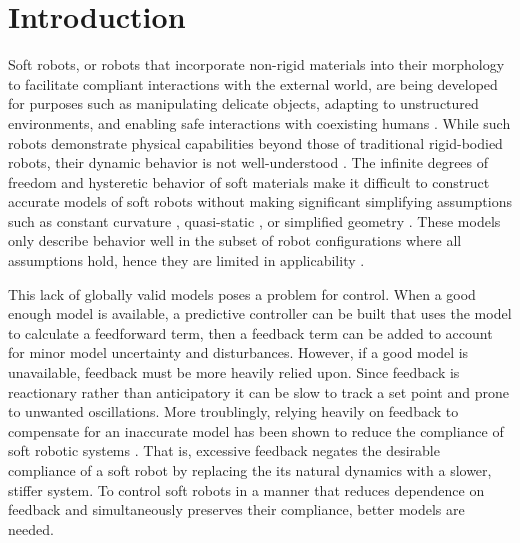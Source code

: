\section{Introduction}
\label{sec:intro}

Soft robots, or robots that incorporate non-rigid materials into their morphology to facilitate compliant interactions with the external world, are being developed for purposes such as manipulating delicate objects, adapting to unstructured environments, and enabling safe interactions with coexisting humans \cite{rus2015design}.
While such robots demonstrate physical capabilities beyond those of traditional rigid-bodied robots, their dynamic behavior is not well-understood \cite{george2018control}.
The infinite degrees of freedom and hysteretic behavior of soft materials make it difficult to construct accurate models of soft robots without making significant simplifying assumptions such as constant curvature \cite{rus2015design}, quasi-static \cite{george2018control}, or simplified geometry \cite{bruder2017model} .
These models 
only describe behavior well in the subset of robot configurations where all assumptions hold, hence they are limited in applicability .

This lack of globally valid models poses a problem for control.
When a good enough model   is available, a predictive controller can be built that uses the model to calculate a feedforward term, then a feedback term can be added to account for minor model uncertainty and disturbances.
However, if a good model is unavailable, feedback must be more heavily relied upon.
Since feedback is reactionary rather than anticipatory it can be slow to track a set point and prone to unwanted oscillations.
More troublingly, relying heavily on feedback to compensate for an inaccurate model has been shown to reduce the compliance of soft robotic systems \cite{della2017controlling}.
That is, excessive feedback negates the desirable compliance of a soft robot by replacing the its natural dynamics with a slower, stiffer system.
To control soft robots in a manner that reduces dependence on feedback and simultaneously preserves their compliance, better models are needed.

